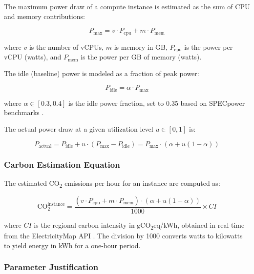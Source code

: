\documentclass[conference]{IEEEtran}
\begin{document}
The maximum power draw of a compute instance is estimated as the sum of CPU and memory contributions:

\begin{equation}
P_{\text{max}} = v \cdot P_{\text{cpu}} + m \cdot P_{\text{mem}}
\label{eq:pmax}
\end{equation}

\noindent where $v$ is the number of vCPUs, $m$ is memory in GB, $P_{\text{cpu}}$ is the power per vCPU (watts), and $P_{\text{mem}}$ is the power per GB of memory (watts).

The idle (baseline) power is modeled as a fraction of peak power:

\begin{equation}
P_{\text{idle}} = \alpha \cdot P_{\text{max}}
\label{eq:pidle}
\end{equation}

\noindent where $\alpha \in [0.3, 0.4]$ is the idle power fraction, set to 0.35 based on SPECpower benchmarks \cite{b12}.

The actual power draw at a given utilization level $u \in [0, 1]$ is:

\begin{equation}
P_{\text{actual}} = P_{\text{idle}} + u \cdot (P_{\text{max}} - P_{\text{idle}}) = P_{\text{max}} \cdot (\alpha + u(1 - \alpha))
\label{eq:pactual}
\end{equation}

\subsubsection{Carbon Estimation Equation}

The estimated CO\textsubscript{2} emissions per hour for an instance are computed as:

\begin{equation}
\text{CO}_{2}^{\text{instance}} = \frac{(v \cdot P_{\text{cpu}} + m \cdot P_{\text{mem}}) \cdot (\alpha + u(1-\alpha))}{1000} \times CI
\label{eq:co2}
\end{equation}

\noindent where $CI$ is the regional carbon intensity in gCO\textsubscript{2}eq/kWh, obtained in real-time from the ElectricityMap API \cite{b9}. The division by 1000 converts watts to kilowatts to yield energy in kWh for a one-hour period.

\subsubsection{Parameter Justification}
\end{document}

